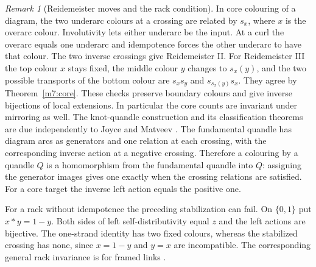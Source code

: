 \documentclass[11pt,reqno]{amsart}
\theoremstyle{definition}
\theoremstyle{remark}
\newtheorem{remark}[theorem]{Remark}
\numberwithin{equation}{section}
\begin{document}
\begin{remark}[Reidemeister moves and the rack condition]\label{m7:reidemeister}
In core colouring of a diagram, the two underarc colours at a crossing
are related by $s_x$, where $x$ is the overarc colour. Involutivity lets
either underarc be the input. At a curl the overarc equals one underarc
and idempotence forces the other underarc to have that colour. The two
inverse crossings give Reidemeister II. For Reidemeister III the top
colour $x$ stays fixed, the middle colour $y$ changes to $s_x(y)$, and
the two possible transports of the bottom colour are
$s_xs_y$ and $s_{s_x(y)}s_x$. They agree by Theorem~\ref{m7:core}.
These checks preserve boundary colours and give inverse bijections
of local extensions. In particular the core counts are invariant under
mirroring as well. The knot-quandle construction and its classification
theorems are due independently to Joyce and Matveev
\cite{m7:Joyce,m7:Matveev}. The fundamental quandle has diagram arcs as
generators and one relation at each crossing, with the corresponding
inverse action at a negative crossing. Therefore a colouring by a
quandle $Q$ is a homomorphism from the fundamental quandle into $Q$:
assigning the generator images gives one exactly when the crossing
relations are satisfied. For a core target the inverse left action
equals the positive one.

For a rack without idempotence the preceding stabilization can fail.
On $\{0,1\}$ put $x*y=1-y$. Both sides of left self-distributivity
equal $z$ and the left actions are bijective. The one-strand identity
has two fixed colours, whereas the stabilized crossing has none,
since $x=1-y$ and $y=x$ are incompatible. The corresponding general rack
invariance is for framed links \cite{m7:FennRourke}.
\end{remark}
\end{document}
